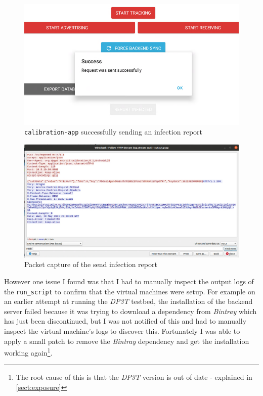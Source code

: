\documentclass[
    author={Jacob Daniel Halsey},
    supervisor={Prof. Awais Rashid},
    degree={BSc},
    title={Building a Testbed for Evaluating Privacy Enhancing Technologies  (PETs)},
    subtitle={},
    type={software development},
    year={2021}
]{dissertation}
\begin{document}
\begin{figure}
	\centering
	\includegraphics[width=12cm]{img/successfully}
	\caption{\texttt{calibration-app} successfully sending an infection report}
	\label{fig:successfully}
\end{figure}

\begin{figure}
	\centering
	\includegraphics[width=16cm]{img/dp3t_capture}
	\caption{Packet capture of the send infection report}
	\label{fig:dp3t_capture}
\end{figure}

However one issue I found was that I had to manually inspect the output logs of the \texttt{run\_script}
to confirm that the virtual machines were setup. 
For example on an earlier attempt at running the \emph{DP3T} testbed, the installation of the backend server
failed because it was trying to download a dependency from \emph{Bintray} which has just been
discontinued, but I was not notified of this and had to manually inspect the virtual machine's
logs to discover this. Fortunately I was able to apply a small patch to remove the \emph{Bintray}
dependency and get the installation working again\footnote{The root cause of this is that
the \emph{DP3T} version is out of date - explained in \ref{sect:exposure}}. \\
\end{document}
